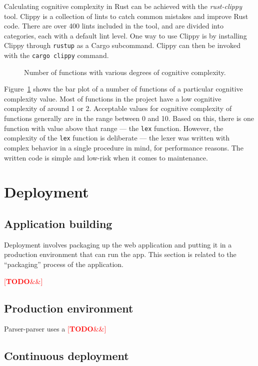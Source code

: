 \documentclass[english,engineering]{wizthesis}
\newcommand{\todo}[1]{%
  \textcolor{red}{[\textbf{TODO}\ifx&#1&{}\else{ }\fi\emph{#1}]}%
}
\newcommand{\thisproject}{Parser-parser}
\begin{document}
Calculating cognitive complexity in Rust can be achieved with the
\emph{rust-clippy} tool. Clippy is a collection of lints to catch common
mistakes and improve Rust code. There are over 400 lints included in the tool,
and are divided into categories, each with a default lint level. One way to use
Clippy is by installing Clippy through \texttt{rustup} as a Cargo subcommand.
Clippy can then be invoked with the \texttt{cargo clippy} command.

\begin{figure}[H]
  \centering
  
  \caption{Number of functions with various degrees of cognitive complexity.}
  \label{fig:cognitive-complexity}
\end{figure}

Figure~\ref{fig:cognitive-complexity} shows the bar plot of a number of
functions of a particular cognitive complexity value. Most of functions in the
project have a low cognitive complexity of around 1 or 2. Acceptable values for
cognitive complexity of functions generally are in the range between 0 and 10.
Based on this, there is one function with value above that range --- the
\texttt{lex} function. However, the complexity of the \texttt{lex} function is
deliberate --- the lexer was written with complex behavior in a single procedure
in mind, for performance reasons. The written code is simple and low-risk when
it comes to maintenance.

\newpage

\chapter{Deployment}

\section{Application building}

Deployment involves packaging up the web application and putting it in a
production environment that can run the app. This section is related to the
``packaging'' process of the application.

\todo{}

\section{Production environment}

\thisproject{} uses a \todo{}

\section{Continuous deployment}
\end{document}

